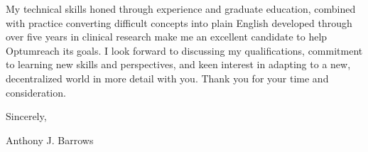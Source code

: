 \documentclass[letterpaper,11pt]{article}
\newcommand{\company}{Optum}
\newcommand{\actionStatment}{
	My technical skills honed through experience and graduate education, combined with practice converting difficult concepts into plain English developed through over five years in clinical research make me an excellent candidate to help \company \space reach its goals.
}
\begin{document}
	\actionStatment I look forward to discussing my qualifications, commitment to learning new skills and perspectives, and keen interest in adapting to a new, decentralized world in more detail with you. Thank you for your time and consideration.
	
	\vspace{5mm}
	
	Sincerely,
	\vspace{3mm}
	
	Anthony J. Barrows
\end{document}
